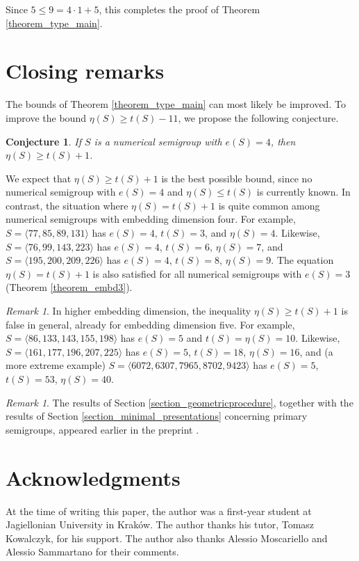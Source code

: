 \documentclass[12pt]{article}
\newtheorem{conj}[thm]{Conjecture}
\theoremstyle{remark}
\newtheorem{remark}[thm]{Remark}
\begin{document}
Since $5 \leq 9 = 4 \cdot 1 + 5$, this completes the proof of Theorem \ref{theorem_type_main}.


\section{Closing remarks}
The bounds of Theorem \ref{theorem_type_main} can most likely be improved. To improve the bound $\eta(S) \geq t(S)-11$, we propose the following conjecture.


\begin{conj}\label{conjecture}
    If $S$ is a numerical semigroup with $e(S) = 4$, then $\eta(S) \geq t(S) +1$.
\end{conj}
 
We expect that $\eta(S) \geq t(S) +1$ is the best possible bound, since no numerical semigroup with $e(S)=4$ and $\eta(S) \leq t(S)$ is currently known. In contrast, the situation where $\eta(S) = t(S) +1$ is quite common among numerical semigroups with embedding dimension four. For example, $S = \langle 77,85,89,131 \rangle$ has $e(S)=4$, $t(S)=3$, and $\eta(S)=4$. Likewise, $S = \langle 76,99,143,223 \rangle$ has $e(S)=4$, $t(S)=6$, $\eta(S)=7$, and $S = \langle 195,200,209,226 \rangle$ has $e(S)=4$, $t(S)=8$, $\eta(S)=9$. The equation $\eta(S) = t(S) +1$ is also satisfied for all numerical semigroups with $e(S)=3$ (Theorem \ref{theorem_embd3}).

\begin{remark}
    In higher embedding dimension, the inequality $\eta(S) \geq t(S) +1$ is false in general, already for embedding dimension five. For example, 
    $S=\langle 86,133,143,155,198 \rangle$ has $e(S)=5$ and $t(S)=\eta(S)=10$. Likewise, $S=\langle 161,177,196,207,225 \rangle$ has $e(S)=5$, $t(S)= 18$, $\eta(S)=16$, and (a more extreme example) $S = \langle 6072, 6307,7965, 8702, 9423 \rangle$ has $e(S)=5$, $t(S)=53$, $\eta(S)=40$.
\end{remark}

\begin{remark}
    The results of Section \ref{section_geometricprocedure}, together with the results of Section \ref{section_minimal_presentations} concerning primary semigroups, appeared earlier in the preprint \cite{Chomicz}.
\end{remark}

\section{Acknowledgments}
At the time of writing this paper, the author was a first-year student at Jagiellonian University in Kraków. The author thanks his tutor,
Tomasz Kowalczyk, for his support.
The author also thanks Alessio Moscariello and Alessio Sammartano for their comments.
\end{document}
